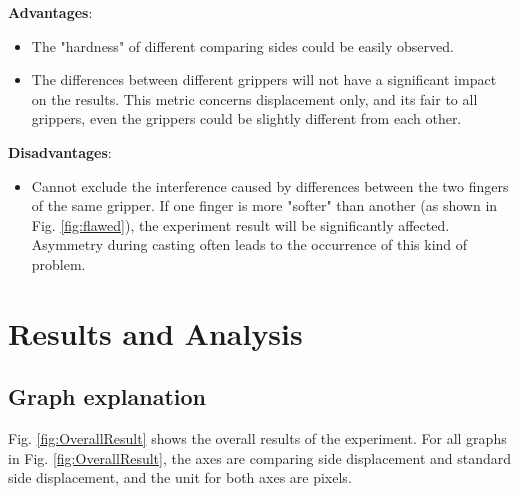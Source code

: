 \documentclass[conference]{IEEEtran}
\begin{document}
 \textbf{Advantages}:
 \begin{itemize}
     \item The "hardness" of different comparing sides could be easily observed. 
     \item The differences between different grippers will not have a significant impact on the results. This metric concerns displacement only, and its fair to all grippers, even the grippers could be slightly different from each other.
 \end{itemize}
 
 \textbf{Disadvantages}:
  \begin{itemize}
     \item Cannot exclude the interference caused by differences between the two fingers of the same gripper. If one finger is more "softer" than another (as shown in Fig. \ref{fig:flawed}), the experiment result will be significantly affected. Asymmetry during casting often leads to the occurrence of this kind of problem.
 \end{itemize}




\section{Results and Analysis}

\label{results}

\subsection{Graph explanation}


Fig. \ref{fig:OverallResult} shows the overall results of the experiment. For all graphs in Fig. \ref{fig:OverallResult}, the axes are comparing side displacement and standard side displacement, and the unit for both axes are pixels.
\end{document}
